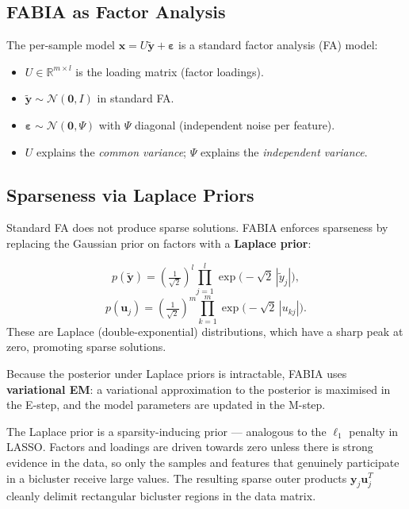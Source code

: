 \documentclass[11pt, oneside]{book}
\begin{document}
\subsection*{FABIA as Factor Analysis}

The per-sample model $\mathbf{x} = U\tilde{\mathbf{y}} + \boldsymbol{\varepsilon}$ is a standard
factor analysis (FA) model:
\begin{itemize}
  \item $U \in \mathbb{R}^{m \times l}$ is the loading matrix (factor loadings).
  \item $\tilde{\mathbf{y}} \sim \mathcal{N}(\mathbf{0}, I)$ in standard FA.
  \item $\boldsymbol{\varepsilon} \sim \mathcal{N}(\mathbf{0}, \Psi)$ with $\Psi$ diagonal (independent noise per feature).
  \item $U$ explains the \emph{common variance}; $\Psi$ explains the \emph{independent variance}.
\end{itemize}

\subsection*{Sparseness via Laplace Priors}

Standard FA does not produce sparse solutions. FABIA enforces sparseness by replacing the Gaussian
prior on factors with a \textbf{Laplace prior}:

\begin{thmbox}[title={FABIA Laplace Priors}]
\[
  p(\tilde{\mathbf{y}}) = \left(\tfrac{1}{\sqrt{2}}\right)^l \prod_{j=1}^{l} \exp\!\bigl(-\sqrt{2}\,|\tilde{y}_j|\bigr),
\]
\[
  p(\mathbf{u}_j) = \left(\tfrac{1}{\sqrt{2}}\right)^m \prod_{k=1}^{m} \exp\!\bigl(-\sqrt{2}\,|u_{kj}|\bigr).
\]
These are Laplace (double-exponential) distributions, which have a sharp peak at zero,
promoting sparse solutions.
\end{thmbox}

Because the posterior under Laplace priors is intractable, FABIA uses
\textbf{variational EM}: a variational approximation to the posterior is maximised
in the E-step, and the model parameters are updated in the M-step.

\begin{intbox}
The Laplace prior is a sparsity-inducing prior — analogous to the $\ell_1$ penalty in LASSO.
Factors and loadings are driven towards zero unless there is strong evidence in the data,
so only the samples and features that genuinely participate in a bicluster receive large values.
The resulting sparse outer products $\mathbf{y}_j\mathbf{u}_j^T$ cleanly delimit rectangular
bicluster regions in the data matrix.
\end{intbox}
\end{document}
